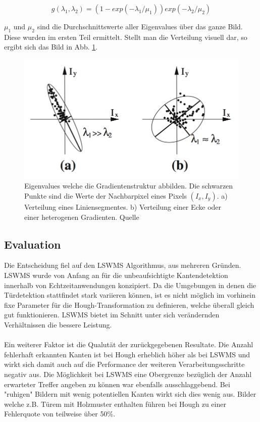\begin{equation}
g(\lambda_1, \lambda_2) = (1 - exp(-\lambda_1/\mu_1)) exp(-\lambda_2/\mu_2)
\end{equation}

$\mu_1$ und $\mu_2$ sind die Durchschnittswerte aller Eigenvalues über das ganze Bild. Diese wurden im ersten Teil ermittelt. Stellt man die Verteilung visuell dar, so ergibt sich das Bild in Abb. \ref{fig:lswms-eigenvalues}.

\begin{figure}[!ht]
\centering
\includegraphics[scale=0.5]{images/lswms-eigenvalues} 
\caption{Eigenvalues welche die Gradientenstruktur abbilden. Die schwarzen Punkte sind die Werte der Nachbarpixel eines Pixels $(I_x, I_y)$. a) Verteilung eines Liniensegmentes. b) Verteilung einer Ecke oder einer heterogenen Gradienten. Quelle \cite{nieto}}
\label{fig:lswms-eigenvalues}
\end{figure}

\subsection{Evaluation}

Die Entscheidung fiel auf den LSWMS Algorithmus, aus mehreren Gründen. LSWMS wurde von Anfang an für die unbeaufsichtigte Kantendetektion innerhalb von Echtzeitanwendungen konzipiert. Da die Umgebungen in denen die Türdetektion stattfindet stark variieren können, ist es nicht möglich im vorhinein fixe Parameter für die Hough-Transformation zu definieren, welche überall gleich gut funktionieren. LSWMS bietet im Schnitt unter sich verändernden Verhältnissen die bessere Leistung.
\paragraph{}
Ein weiterer Faktor ist die Qualutät der zurückgegebenen Resultate. Die Anzahl fehlerhaft erkannten Kanten ist bei Hough erheblich höher als bei LSWMS und wirkt sich damit auch auf die Performance der weiteren Verarbeitungsschritte negativ aus. Die Möglichkeit bei LSWMS eine Obergrenze bezüglich der Anzahl erwarteter Treffer angeben zu können war ebenfalls ausschlaggebend. Bei "ruhigen" Bildern mit wenig potentiellen Kanten wirkt sich dies wenig aus. Bilder welche z.B. Türem mit Holzmuster enthalten führen bei Hough zu einer Fehlerquote von teilweise über 50\%.
